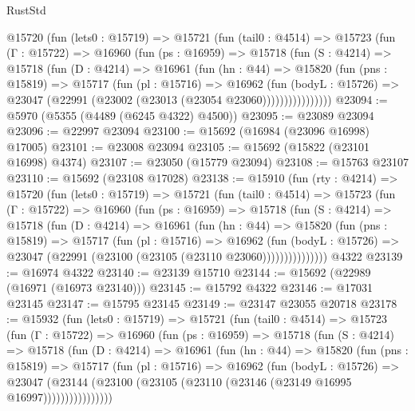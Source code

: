 \begin{lexlean}{RustStd}
\begin{coremodule}
      @15720
        (fun (lets0 : @15719) =>
        @15721
          (fun (tail0 : @4514) =>
          @15723
            (fun (Γ : @15722) =>
            @16960
              (fun (ps : @16959) =>
              @15718
                (fun (S : @4214) =>
                @15718
                  (fun (D : @4214) =>
                  @16961
                    (fun (hn : @44) =>
                    @15820
                      (fun (pns : @15819) =>
                      @15717
                        (fun (pl : @15716) =>
                        @16962
                          (fun (bodyL : @15726) =>
                          @23047 (@22991 (@23002 (@23013 (@23054 @23060))))))))))))))))
@23094 := @5970 (@5355 (@4489 (@6245 @4322) @4500))
@23095 := @23089 @23094
@23096 := @22997 @23094
@23100 := @15692 (@16984 (@23096 @16998) @17005)
@23101 := @23008 @23094
@23105 := @15692 (@15822 (@23101 @16998) @4374)
@23107 := @23050 (@15779 @23094)
@23108 := @15763 @23107
@23110 := @15692 (@23108 @17028)
@23138 := @15910
    (fun (rty : @4214) =>
    @15720
      (fun (lets0 : @15719) =>
      @15721
        (fun (tail0 : @4514) =>
        @15723
          (fun (Γ : @15722) =>
          @16960
            (fun (ps : @16959) =>
            @15718
              (fun (S : @4214) =>
              @15718
                (fun (D : @4214) =>
                @16961
                  (fun (hn : @44) =>
                  @15820
                    (fun (pns : @15819) =>
                    @15717
                      (fun (pl : @15716) =>
                      @16962
                        (fun (bodyL : @15726) =>
                        @23047 (@22991 (@23100 (@23105 (@23110 @23060)))))))))))))))
    @4322
@23139 := @16974 @4322
@23140 := @23139 @15710
@23144 := @15692 (@22989 (@16971 (@16973 @23140)))
@23145 := @15792 @4322
@23146 := @17031 @23145
@23147 := @15795 @23145
@23149 := @23147 @23055 @20718
@23178 := @15932
    (fun (lets0 : @15719) =>
    @15721
      (fun (tail0 : @4514) =>
      @15723
        (fun (Γ : @15722) =>
        @16960
          (fun (ps : @16959) =>
          @15718
            (fun (S : @4214) =>
            @15718
              (fun (D : @4214) =>
              @16961
                (fun (hn : @44) =>
                @15820
                  (fun (pns : @15819) =>
                  @15717
                    (fun (pl : @15716) =>
                    @16962
                      (fun (bodyL : @15726) =>
                      @23047
                        (@23144
                          (@23100 (@23105 (@23110 (@23146 (@23149 @16995 @16997))))))))))))))))

\end{coremodule}
\end{lexlean}
